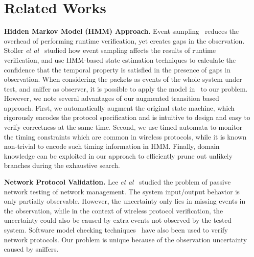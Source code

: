 \section{Related Works}
\label{sec:related}

\textbf{Hidden Markov Model (HMM) Approach.} Event
sampling~\cite{bonakdarpour2011sampling,hauswirth2004low,arnold2008qvm,fei2006artemis}
reduces the overhead of performing runtime verification, yet creates gaps in the
observation. Stoller \textit{et al}~\cite{stoller2011runtime} studied how event
sampling affects the results of runtime verification, and use HMM-based state
estimation techniques to calculate the confidence that the temporal property is
satisfied in the presence of gaps in observation. When considering the packets
as events of the whole system under test, and sniffer as observer, it is
possible to apply the model in~\cite{stoller2011runtime} to our problem.
However, we note several advantages of our augmented transition based approach.
First, we automatically augment the original state machine, which rigorously
encodes the protocol specification and is intuitive to design and easy to verify
correctness at the same time. Second, we use timed automata to monitor the
timing constraints which are common in wireless protocols, while it is known
non-trivial to encode such timing information in HMM. Finally,
domain knowledge can be exploited in our approach to efficiently prune out
unlikely branches during the exhaustive search.

\textbf{Network Protocol Validation.} Lee \textit{et al}~\cite{lee1997passive}
studied the problem of passive network testing of network management. The system
input/output behavior is only partially observable. However, the uncertainty
only lies in missing events in the observation, while in the context of wireless
protocol verification, the uncertainty could also be caused by extra events not
observed by the tested system. Software model checking
techniques~\cite{musuvathi2002cmc,godefroid1997model} have also been used to
verify network protocols. Our problem is unique because of the observation
uncertainty caused by sniffers.

